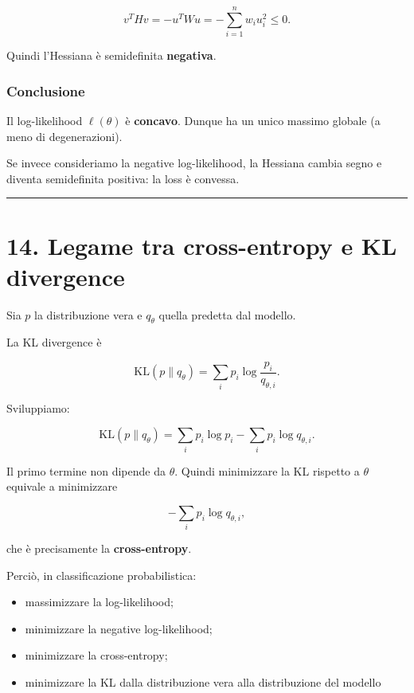 \documentclass{article}
\providecommand{\tightlist}{%
  \setlength{\itemsep}{0pt}\setlength{\parskip}{0pt}}
\begin{document}
\[
v^THv = -u^TWu = -\sum_{i=1}^n w_i u_i^2 \le 0.
\]

Quindi l'Hessiana è semidefinita \textbf{negativa}.

\subsubsection{Conclusione}\label{conclusione-7}

Il log-likelihood \(\ell(\theta)\) è \textbf{concavo}. Dunque ha un
unico massimo globale (a meno di degenerazioni).

Se invece consideriamo la negative log-likelihood, la Hessiana cambia
segno e diventa semidefinita positiva: la loss è convessa.

\begin{center}\rule{0.5\linewidth}{0.5pt}\end{center}

\section{14. Legame tra cross-entropy e KL
divergence}\label{legame-tra-cross-entropy-e-kl-divergence}

Sia \(p\) la distribuzione vera e \(q_\theta\) quella predetta dal
modello.

La KL divergence è

\[
\mathrm{KL}(p\|q_\theta)=\sum_i p_i \log\frac{p_i}{q_{\theta,i}}.
\]

Sviluppiamo:

\[
\mathrm{KL}(p\|q_\theta)
=
\sum_i p_i\log p_i - \sum_i p_i\log q_{\theta,i}.
\]

Il primo termine non dipende da \(\theta\). Quindi minimizzare la KL
rispetto a \(\theta\) equivale a minimizzare

\[
-\sum_i p_i\log q_{\theta,i},
\]

che è precisamente la \textbf{cross-entropy}.

Perciò, in classificazione probabilistica:

\begin{itemize}
\tightlist
\item
  massimizzare la log-likelihood;
\item
  minimizzare la negative log-likelihood;
\item
  minimizzare la cross-entropy;
\item
  minimizzare la KL dalla distribuzione vera alla distribuzione del
  modello
\end{itemize}
\end{document}
